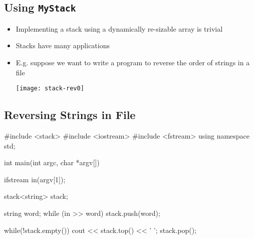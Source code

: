 
\begin{slide}
\section{Using \texttt{MyStack}}
\pb

  \begin{itemize}
  \item Implementing a stack using a dynamically re-sizable array is
    trivial\pause
  \item Stacks have many applications\pause
  \item E.g. suppose we want to write a program to reverse the order of
    strings in a file\pause
\begin{center}
  \texttt{[image: stack-rev0]}
\end{center}

  \end{itemize}

\end{slide}



\begin{slide}
\section[-1]{Reversing Strings in File}

\begin{cpp}
#include <stack>
#include <iostream>
#include <fstream>
using namespace std;

int main(int argc, char *argv[]) {
  ifstream in(argv[1]);

  stack<string> stack;

  string word;
  while (in >> word)
    stack.push(word);

  while(!stack.empty()) {
      cout << stack.top() << ' ';
      stack.pop();
  }
}
\end{cpp}
\end{slide}



